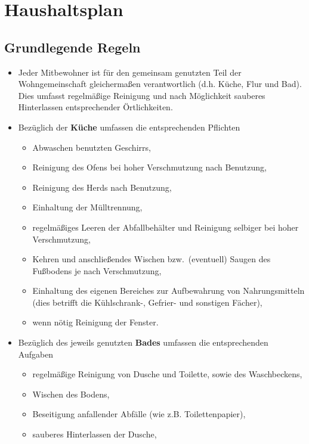 \documentclass{article}
\begin{document}
\pagestyle{empty}
\section*{Haushaltsplan}

\subsection*{Grundlegende Regeln}

\begin{itemize}
        \item Jeder Mitbewohner ist für den gemeinsam genutzten Teil der Wohngemeinschaft gleichermaßen verantwortlich (d.h. Küche, Flur und Bad).
    Dies umfasst regelmäßige Reinigung und nach Möglichkeit sauberes Hinterlassen entsprechender Örtlichkeiten.
    \item Bezüglich der \textbf{Küche} umfassen die entsprechenden Pflichten
    \begin{itemize}
            \item Abwaschen benutzten Geschirrs,
            \item Reinigung des Ofens bei hoher Verschmutzung nach Benutzung,
            \item Reinigung des Herds nach Benutzung,
            \item Einhaltung der Mülltrennung,
            \item regelmäßiges Leeren der Abfallbehälter und Reinigung selbiger bei hoher Verschmutzung,
            \item Kehren und anschließendes Wischen bzw.\ (eventuell) Saugen des Fußbodens je nach Verschmutzung,
            \item Einhaltung des eigenen Bereiches zur Aufbewahrung von Nahrungsmitteln (dies betrifft die Kühlschrank-, Gefrier- und sonstigen Fächer),
            \item wenn nötig Reinigung der Fenster.
    \end{itemize}
        \item Bezüglich des jeweils genutzten \textbf{Bades} umfassen die entsprechenden Aufgaben
    \begin{itemize}
            \item regelmäßige Reinigung von Dusche und Toilette, sowie des Waschbeckens,
            \item Wischen des Bodens,
            \item Beseitigung anfallender Abfälle (wie z.B. Toilettenpapier),
            \item sauberes Hinterlassen der Dusche,

\end{itemize}
\end{itemize}
\end{document}
